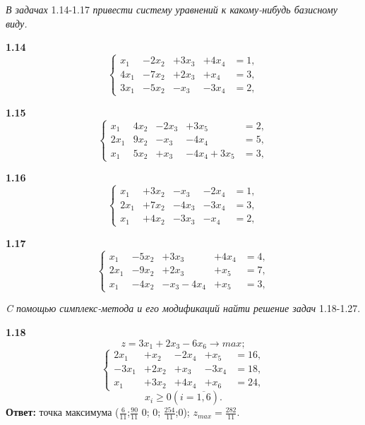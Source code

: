 \documentclass[10pt, a5paper, twoside]{article} %
\begin{document}
\textit{В задачах} 1.14-1.17 \textit{привести систему уравнений к какому-нибудь базисному виду.}

\begin{minipage}{0.4\textwidth}
 \textbf{1.14}
$$
\left\{
\begin{array}{ccccc}
x_1 &-2x_2 &+3x_3 &+4x_4 &=1, \\
4x_1 &-7x_2 &+2x_3 &+x_4 &=3, \\
3x_1 &-5x_2 &-x_3 &-3x_4 &=2,
\end{array}
\right.
$$
\end{minipage}
\hfill
\begin{minipage}{0.4\textwidth}
 \textbf{1.15}
$$
\left\{
\begin{array}{ccccc}
x_1 &4x_2 &-2x_3 &+3x_5 &=2, \\
2x_1 &9x_2 &-x_3 &-4x_4 &=5, \\
x_1 &5x_2 &+x_3 &-4x_4+3x_5 &=3,
\end{array}
\right.
$$
\end{minipage}

\begin{minipage}{0.4\textwidth}
 \textbf{1.16}
$$
\left\{
\begin{array}{ccccc}
x_1 &+3x_2 &-x_3 &-2x_4 &=1, \\
2x_1 &+7x_2 &-4x_3 &-3x_4 &=3, \\
x_1 &+4x_2 &-3x_3 &-x_4 &=2,
\end{array}
\right.
$$
\end{minipage}
\hfill
\begin{minipage}{0.4\textwidth}
 \textbf{1.17}
$$
\left\{
\begin{array}{ccccc}
x_1 &-5x_2 &+3x_3 &+4x_4 &=4, \\
2x_1 &-9x_2 &+2x_3 &+x_5 &=7, \\
x_1 &-4x_2 &-x_3-4x_4 &+x_5 &=3,
\end{array}
\right.
$$
\end{minipage}
\vspace{6pt}

\textit{C помощью симплекс-метода и его модификаций найти решение задач} 1.18-1.27.
\vspace{6pt}

\begin{minipage}{0.4\textwidth}
\textbf{1.18}
\[z=3x_1 + 2x_3 - 6x_6\rightarrow max;\]
$$
\left\{
\begin{array}{ccccc}
2x_1  &+x_2  &-2x_4  &+x_5  &=16, \\
-3x_1 &+2x_2 &+x_3   &-3x_4 &=18, \\
x_1   &+3x_2 &+4x_4  &+x_6  &=24,
\end{array}
\right.
$$
\[x_i \geq 0 (i = \overline{1,6}).\]
\textbf{Ответ: } точка максимума ($\frac{6}{11}$;$\frac{90}{11}$ 0; 0; $\frac{254}{11}$;0); $z_{max} = \frac{282}{11}.$
\end{minipage}
\end{document}
